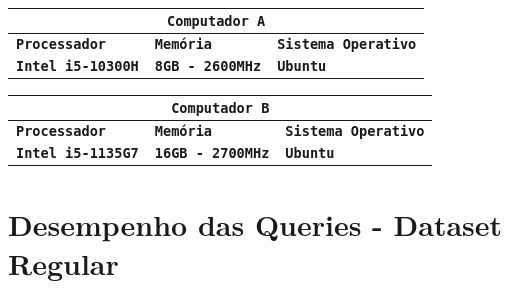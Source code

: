 \documentclass[12pt,a4paper]{report}
\begin{document}
{
\setlength\arrayrulewidth{1pt}

\begin{center}
    \begin{tabular}{ |p{4.73cm}|p{4.73cm}|p{4.73cm}|  }
        \hline
        \multicolumn{3}{|c|}{\textbf{\texttt{Computador A}}} \\
        \hline
        \centering\textbf{\texttt{Processador}} & \hfil \textbf{\texttt{Memória}} & \hfil \textbf{\texttt{Sistema Operativo}} \\
        \hline
        \centering\textbf{\texttt{Intel i5-10300H}} & \hfil \texttt{\textbf{8GB - 2600MHz}} & \hfil \texttt{\textbf{Ubuntu}}\\
        \hline
    \end{tabular}
\end{center}


\vspace{10pt}

\begin{center}
    \begin{tabular}{ |p{4.73cm}|p{4.73cm}|p{4.73cm}|  }
        \hline
        \multicolumn{3}{|c|}{\textbf{\texttt{Computador B}}} \\
        \hline
        \centering\textbf{\texttt{Processador}} & \hfil \textbf{\texttt{Memória}} & \hfil \textbf{\texttt{Sistema Operativo}} \\
        \hline
        \centering\textbf{\texttt{Intel i5-1135G7}} & \hfil \texttt{\textbf{16GB - 2700MHz}} & \hfil \texttt{\textbf{Ubuntu}}\\
        \hline
    \end{tabular}
\end{center}
}


\newpage

\section{Desempenho das Queries - Dataset Regular}
\end{document}
